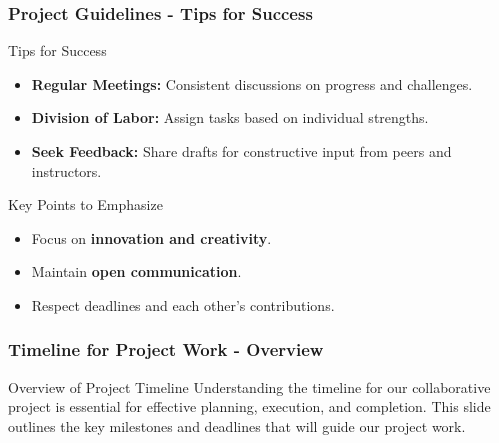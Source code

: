\documentclass[aspectratio=169]{beamer}
\begin{document}
\begin{frame}[fragile]
    \frametitle{Project Guidelines - Tips for Success}
    \begin{block}{Tips for Success}
        \begin{itemize}
            \item \textbf{Regular Meetings:} Consistent discussions on progress and challenges.
            \item \textbf{Division of Labor:} Assign tasks based on individual strengths.
            \item \textbf{Seek Feedback:} Share drafts for constructive input from peers and instructors.
        \end{itemize}
    \end{block}
    \begin{block}{Key Points to Emphasize}
        \begin{itemize}
            \item Focus on \textbf{innovation and creativity}.
            \item Maintain \textbf{open communication}.
            \item Respect deadlines and each other's contributions.
        \end{itemize}
    \end{block}
\end{frame}

\begin{frame}[fragile]
    \frametitle{Timeline for Project Work - Overview}
    \begin{block}{Overview of Project Timeline}
        Understanding the timeline for our collaborative project is essential for effective planning, execution, and completion. This slide outlines the key milestones and deadlines that will guide our project work.
    \end{block}
\end{frame}
\end{document}
